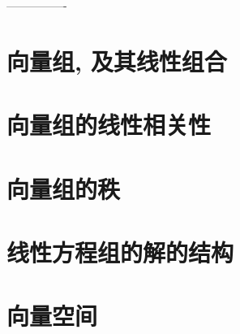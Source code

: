 \documentclass[UTF8]{ctexart}
\begin{document}
	
	
	
	
	
	
	
	
	
	
		----------------
	
	\part{向量组, 及其线性组合}
	
	\part{向量组的线性相关性}
	
	\part{向量组的秩}
	
	\part{线性方程组的解的结构}
	
	\part{向量空间}
	

	
\end{document}
